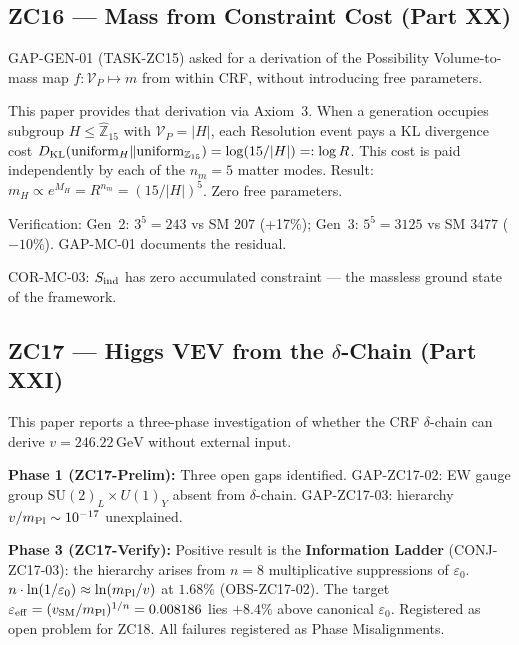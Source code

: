 \documentclass[11pt, a4paper]{article}
\begin{document}
\subsection{ZC16 --- Mass from Constraint Cost (Part XX)}

\begin{zcbox}[title={ZC16: Closing GAP-GEN-01 via Axiom~3}]
\sloppy
GAP-GEN-01 (TASK-ZC15) asked for a derivation of the Possibility
Volume-to-mass map $f: \mathcal{V}_P \mapsto m$ from within CRF,
without introducing free parameters.

This paper provides that derivation via Axiom~3.
When a generation occupies subgroup $H \leq \widehat{\mathbb{Z}}_{15}$
with $\mathcal{V}_P = |H|$, each Resolution event pays a KL divergence
cost $D_{\rm KL}(\text{uniform}_H \| \text{uniform}_{\mathbb{Z}_{15}})
= \log(15/|H|) =: \log R$.
This cost is paid independently by each of the $n_m = 5$ matter modes.
Result: $m_H \propto e^{M_H} = R^{n_m} = (15/|H|)^5$.
Zero free parameters.

Verification: Gen~2: $3^5=243$ vs SM $207$ (+17\%);
Gen~3: $5^5=3125$ vs SM $3477$ ($-10\%$). GAP-MC-01 documents the residual.

COR-MC-03: $S_{\rm ind}$ has zero accumulated constraint --- the massless
ground state of the framework.
\end{zcbox}

\subsection{ZC17 --- Higgs VEV from the $\delta$-Chain (Part XXI)}

\begin{zcbox}[title={ZC17: Information Ladder and Higgs VEV}]
\sloppy
This paper reports a three-phase investigation of whether the
CRF $\delta$-chain can derive $v = 246.22\,\mathrm{GeV}$ without external input.

\textbf{Phase 1 (ZC17-Prelim):} Three open gaps identified.
GAP-ZC17-02: EW gauge group $\mathrm{SU}(2)_L\times U(1)_Y$ absent from
$\delta$-chain. GAP-ZC17-03: hierarchy $v/m_{\rm Pl}\sim 10^{-17}$ unexplained.

\textbf{Phase 3 (ZC17-Verify):} Positive result is the
\textbf{Information Ladder} (CONJ-ZC17-03): the hierarchy arises from
$n=8$ multiplicative suppressions of $\varepsilon_0$.
$n\cdot\ln(1/\varepsilon_0)\approx\ln(m_{\rm Pl}/v)$ at $1.68\%$ (OBS-ZC17-02).
The target $\varepsilon_{\rm eff} = (v_{\rm SM}/m_{\rm Pl})^{1/n} = 0.008186$
lies $+8.4\%$ above canonical $\varepsilon_0$. Registered as open problem
for ZC18. All failures registered as Phase Misalignments.
\end{zcbox}
\end{document}
